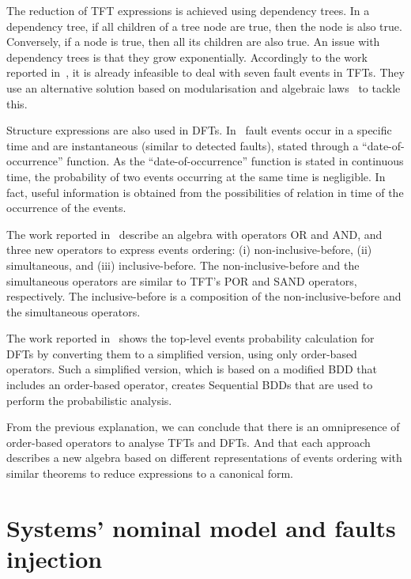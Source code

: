 \documentclass[en,twoside,onehalfspacing,phd]{risethesis}
\begin{document}
The reduction of \ac{TFT} expressions is achieved using dependency trees.
In a dependency tree, if all children of a tree node are true, then the node is also true.
Conversely, if a node is true, then all its children are also true.
An issue with dependency trees is that they grow exponentially.
Accordingly to the work reported in~\cite{WP2010}, it is already infeasible to deal with seven fault events in TFTs.
They use an alternative solution based on modularisation and algebraic laws~\cite{WP2009} to tackle this.

Structure expressions are also used in \acp{DFT}.
In~\cite{Merle2010,MRL+2010,MRL2011} fault events occur in a specific time and are instantaneous (similar to detected faults), stated through a ``date-of-occurrence'' function.
As the ``date-of-occurrence'' function is stated in continuous time, the probability of two events occurring at the same time is negligible.
In fact, useful information is obtained from the possibilities of relation in time of the occurrence of the events.

The work reported in~\cite{Merle2010,MRL+2010,MRL2011} describe an algebra with operators OR and AND, and three new operators to express events ordering: (i) non-inclusive-before, (ii) simultaneous, and (iii) inclusive-before.
The non-inclusive-before and the simultaneous operators are similar to \ac{TFT}'s POR and SAND operators, respectively.
The inclusive-before is a composition of the non-inclusive-before and the simultaneous operators.

The work reported in~\cite{TXD2011,XTD2012} shows the top-level events probability calculation for \acp{DFT} by converting them to a simplified version, using only order-based operators.
Such a simplified version, which is based on a modified \ac{BDD} that includes an order-based operator, creates Sequential BDDs that are used to perform the probabilistic analysis.

From the previous explanation, we can conclude that there is an omnipresence of order-based operators to analyse \acp{TFT} and \acp{DFT}.
And that each approach describes a new algebra based on different representations of events ordering with similar theorems to reduce expressions to a canonical form.

\section{Systems' nominal model and faults injection}
\label{sec:faults-injection}
\end{document}
